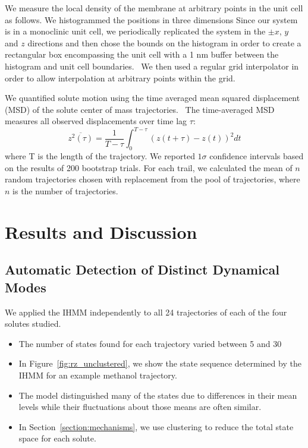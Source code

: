 \documentclass[journal=jpcbfk,manuscript=article]{achemso}
\begin{document}
  We measure the local density of the membrane at arbitrary
  points in the unit cell as follows. We histogrammed the positions in three dimensions
  Since our system is in a monoclinic unit cell, we periodically replicated
  the system in the $\pm x$, $y$ and $z$ directions and then chose the bounds on the
  histogram in order to create a rectangular box encompassing the unit cell with
  a 1 nm buffer between the histogram and unit cell boundaries.~\cite{van_der_walt_numpy_2011} We then used a regular
  grid interpolator in order to allow interpolation at arbitrary points within the grid.~\cite{virtanen_scipy_2020} 
  
  We quantified solute motion using the time averaged mean squared displacement (MSD)
  of the solute center of mass trajectories.~\cite{meroz_toolbox_2015} The time-averaged MSD measures all observed
  displacements over time lag $\tau$:
  \begin{equation}
  	\overline{z^2(\tau)} = \dfrac{1}{T - \tau}\int_{0}^{T - \tau} (z(t + \tau) - z(t))^2 dt
  \label{eqn:tamsd}
  \end{equation}
  where T is the length of the trajectory. We reported $1 \sigma$ confidence intervals 
  based on the results of 200 bootstrap trials. For each trail, we calculated the mean of 
  $n$ random trajectories chosen with replacement from the pool of trajectories, where 
  $n$ is the number of trajectories.

  \section{Results and Discussion}
  
  \subsection{Automatic Detection of Distinct Dynamical Modes}\label{section:find_modes}
  
  We applied the IHMM independently to all 24 trajectories of each of the four solutes studied.
  \begin{itemize}
    \item The number of states found for each trajectory varied between 5 and 30  %
    \item In Figure~\ref{fig:rz_unclustered}, we show the state sequence determined by the
    IHMM for an example methanol trajectory.
    \item The model distinguished many of the states due to differences in their mean levels 
    while their fluctuations about those means are often similar. 
    \item In Section~\ref{section:mechanisms}, we use clustering to reduce the total state
    space for each solute.    
  \end{itemize}
  
\end{document}
